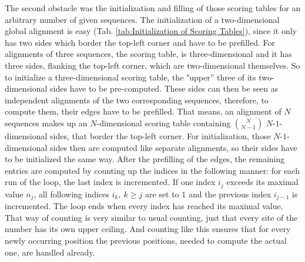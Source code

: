 \documentclass[a4paper,10pt]{thesis}
\begin{document}
{{{      The second obstacle was the initialization and filling of those scoring tables for an arbitrary number of given sequences. The initialization of a two-dimensional global alignment is easy (Tab. \ref{tab:Initialization of Scoring Tables}), since it only has two sides which border the top-left corner and have to be prefilled. For alignments of three sequences, the scoring table, is three-dimensional and it has three sides, flanking the top-left corner, which are two-dimensional themselves. So to initialize a three-dimensional scoring table, the "upper'' three of its two-dimensional sides have to be pre-computed. These sides can then be seen as independent alignments of the two corresponding sequences, therefore, to compute them, their edges have to be prefilled. That means, an alignment of $N$ sequences makes up an $N$-dimensional scoring table containing $\binom{N}{N-1}$ $N\texttt{-}1$-dimensional sides, that border the top-left corner. For initialization, those $N\texttt{-}1$-dimensional sides then are computed like separate alignments, so their sides have to be initialized the same way. After the prefilling of the edges, the remaining entries are computed by counting up the indices in the following manner: for each run of the loop, the last index is incremented. If one index $i_j$ exceeds its maximal value $n_j$, all following indices $i_k,~k\geq j$ are set to $1$ and the previous index $i_{j-1}$ is incremented. The loop ends when every index has reached its maximal value. That way of counting is very similar to usual counting, just that every site of the number has its own upper ceiling. And counting like this ensures that for every newly occurring position the previous positions, needed to compute the actual one, are handled already.
    }
    }}
\end{document}
